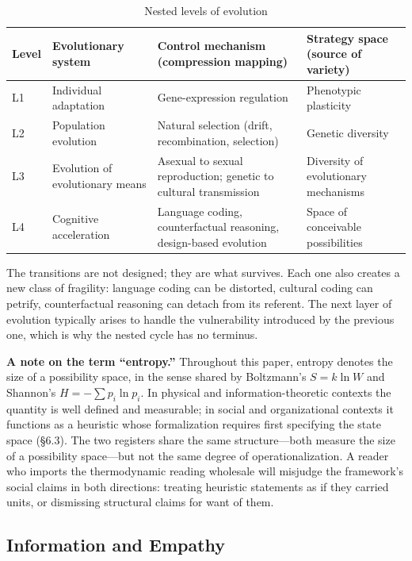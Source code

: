 \documentclass[11pt,a4paper]{article}
\begin{document}
\begin{table}[h]
\centering
\small
\caption{Nested levels of evolution}
\begin{tabular}{p{0.7cm} p{3.0cm} p{4.6cm} p{4.2cm}}
\hline
\textbf{Level} & \textbf{Evolutionary system} & \textbf{Control mechanism (compression mapping)} & \textbf{Strategy space (source of variety)} \\
\hline
L1 & Individual adaptation & Gene-expression regulation & Phenotypic plasticity \\
L2 & Population evolution & Natural selection (drift, recombination, selection) & Genetic diversity \\
L3 & Evolution of evolutionary means & Asexual to sexual reproduction; genetic to cultural transmission & Diversity of evolutionary mechanisms \\
L4 & Cognitive acceleration & Language coding, counterfactual reasoning, design-based evolution & Space of conceivable possibilities \\
\hline
\end{tabular}
\end{table}

The transitions are not designed; they are what survives. Each one also creates a new class of fragility: language coding can be distorted, cultural coding can petrify, counterfactual reasoning can detach from its referent. The next layer of evolution typically arises to handle the vulnerability introduced by the previous one, which is why the nested cycle has no terminus.

\textbf{A note on the term ``entropy.''} Throughout this paper, entropy denotes the size of a possibility space, in the sense shared by Boltzmann's $S = k \ln W$ and Shannon's $H = -\sum p_i \ln p_i$. In physical and information-theoretic contexts the quantity is well defined and measurable; in social and organizational contexts it functions as a heuristic whose formalization requires first specifying the state space (\S6.3). The two registers share the same structure---both measure the size of a possibility space---but not the same degree of operationalization. A reader who imports the thermodynamic reading wholesale will misjudge the framework's social claims in both directions: treating heuristic statements as if they carried units, or dismissing structural claims for want of them.

\subsection{Information and Empathy}
\end{document}
